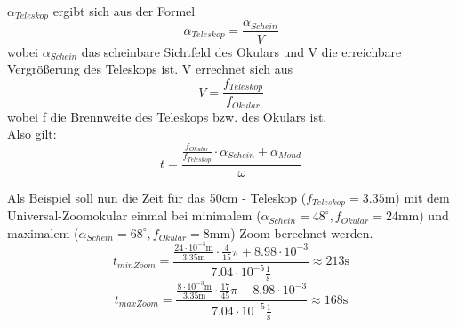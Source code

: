 $\alpha_{Teleskop}$ ergibt sich aus der Formel
\begin{equation}
\alpha_{Teleskop} = \frac{\alpha_{Schein}}{V}
\end{equation}
wobei $\alpha_{Schein}$ das scheinbare Sichtfeld des Okulars und V die erreichbare Vergrößerung des Teleskops ist. V errechnet sich aus
\begin{equation}
V = \frac{f_{Teleskop}}{f_{Okular}}
\end{equation}
wobei f die Brennweite des Teleskops bzw. des Okulars ist.
\\
Also gilt:
\begin{equation}
t = \frac{\frac{f_{Okular}}{f_{Teleskop}}\cdot \alpha_{Schein} + \alpha_{Mond}}{\omega}
\end{equation}

Als Beispiel soll nun die Zeit für das 50cm - Teleskop ($f_{Teleskop} = 3.35\mathrm{m}$) mit dem Universal-Zoomokular einmal bei minimalem ($\alpha_{Schein}=48^{\circ}, f_{Okular} = 24 \mathrm{mm}$) und maximalem ($\alpha_{Schein}=68^{\circ}, f_{Okular} = 8 \mathrm{mm}$) Zoom berechnet werden.
\begin{equation}
t_{minZoom} = \frac{\frac{24 \cdot 10^{-3} \mathrm{m}}{3.35 \mathrm{m}}\cdot \frac{4}{15}\pi + 8.98 \cdot 10^{-3}}{7.04\cdot 10^{-5} \frac{1}{\mathrm{s}}} \approx 213 \mathrm{s}
\end{equation}
\begin{equation}
t_{maxZoom} = \frac{\frac{8 \cdot 10^{-3} \mathrm{m}}{3.35 \mathrm{m}}\cdot \frac{17}{45}\pi + 8.98 \cdot 10^{-3}}{7.04\cdot 10^{-5} \frac{1}{\mathrm{s}}} \approx 168 \mathrm{s}
\end{equation}

